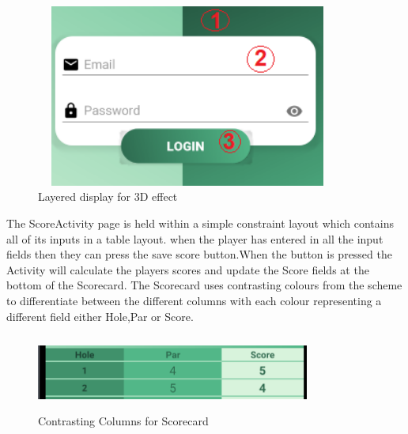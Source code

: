 \begin{figure}[H]
    \centering
    \includegraphics[width=10cm, height = 6cm]{img/login_layers.PNG}
    \caption{Layered display for 3D effect}
    \label{fig:Layered display for 3D effect}
\end{figure}

The ScoreActivity page is held within a simple constraint layout which contains all of its inputs in a table layout. when the player has entered in all the input fields then they can press the save score button.When the button is pressed the Activity will calculate the players scores and update the Score fields at the bottom of the Scorecard. The Scorecard uses contrasting colours from the scheme to differentiate between the different columns with each colour representing a different field either Hole,Par or Score.

\begin{figure}[H]
    \centering
    \includegraphics[width=9cm, height = 2.5cm]{img/score_colours.PNG}
    \caption{Contrasting Columns for Scorecard}
    \label{fig:Contrasting Columns for Scorecard}
\end{figure}
